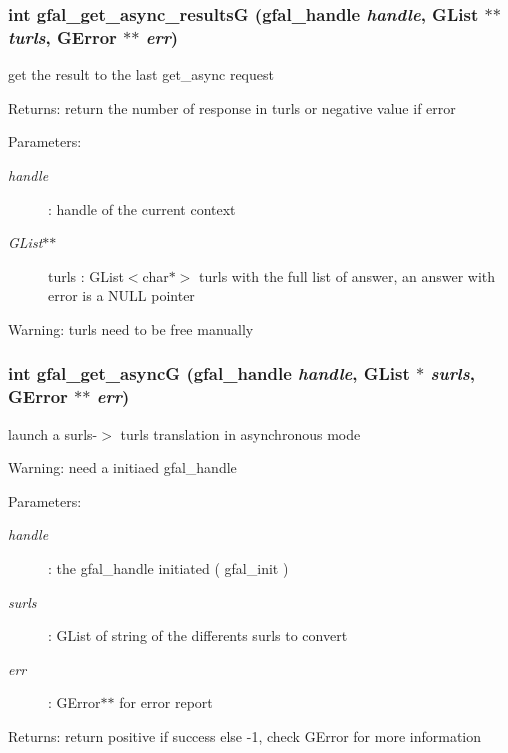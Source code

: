 \subsubsection{\setlength{\rightskip}{0pt plus 5cm}int gfal\_\-get\_\-async\_\-results\-G (gfal\_\-handle {\em handle}, GList $\ast$$\ast$ {\em turls}, GError $\ast$$\ast$ {\em err})}\label{gfal__common__srm_8h_1c3a2a23f764ce8bf5cdd73108e4d9ca}


get the result to the last get\_\-async request \begin{Desc}
\item[Returns:]return the number of response in turls or negative value if error \end{Desc}
\begin{Desc}
\item[Parameters:]
\begin{description}
\item[{\em handle}]: handle of the current context \item[{\em GList$\ast$$\ast$}]turls : GList$<$char$\ast$$>$ turls with the full list of answer, an answer with error is a NULL pointer \end{description}
\end{Desc}
\begin{Desc}
\item[Warning:]turls need to be free manually \end{Desc}
\subsubsection{\setlength{\rightskip}{0pt plus 5cm}int gfal\_\-get\_\-async\-G (gfal\_\-handle {\em handle}, GList $\ast$ {\em surls}, GError $\ast$$\ast$ {\em err})}\label{gfal__common__srm_8h_95ffd4de24c18af334c1d9c270de7d81}


launch a surls-$>$ turls translation in asynchronous mode 

\begin{Desc}
\item[Warning:]need a initiaed gfal\_\-handle \end{Desc}
\begin{Desc}
\item[Parameters:]
\begin{description}
\item[{\em handle}]: the gfal\_\-handle initiated ( gfal\_\-init ) \item[{\em surls}]: GList of string of the differents surls to convert \item[{\em err}]: GError$\ast$$\ast$ for error report \end{description}
\end{Desc}
\begin{Desc}
\item[Returns:]return positive if success else -1, check GError for more information \end{Desc}
